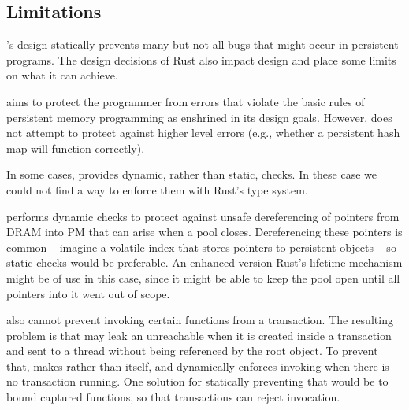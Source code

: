 \subsection{Limitations}
\label{sec:discuss}

\This{}'s design statically prevents many but not all bugs that might occur in
persistent programs.  The design decisions of Rust also impact \this{} design
and place some limits on what it can achieve.

 \This{} aims to protect the programmer from
errors that violate the basic rules of persistent memory programming as
enshrined in its design goals.  However, \this{} does not attempt to protect
against higher level errors (e.g., whether a persistent hash map will function
correctly).

 In some cases, \this{} provides dynamic, rather than static, checks.
In these case we could not find a way to enforce them with Rust's
type system.

\This{} performs dynamic checks to protect
against unsafe dereferencing of  pointers from DRAM into PM that can arise when a pool
closes.  Dereferencing these pointers is common -- imagine a volatile index
that stores pointers to persistent objects -- so static checks would be
preferable.  An enhanced version Rust's lifetime mechanism might be of use in
this case, since it might be able to keep the pool open until all pointers into
it went out of scope.


\This{} also cannot prevent invoking certain functions from a transaction. The resulting problem is that  may leak an unreachable  when it is created inside a transaction and sent to a thread without being referenced by the root object. To prevent that, \this{} makes   rather than  itself, and dynamically enforces invoking  when there is no transaction running. One solution for statically preventing that would be to bound captured functions, so that transactions can reject  invocation.

